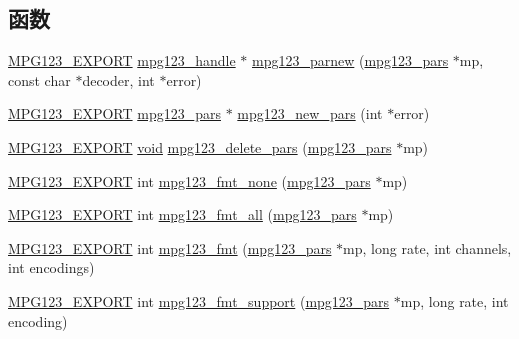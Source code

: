 \subsection*{函数}
\begin{DoxyCompactItemize}
\item 
\hyperlink{mpg123_8h_a2ba98cfba3f760879df70e755b2a61cc}{M\+P\+G123\+\_\+\+E\+X\+P\+O\+RT} \hyperlink{group__mpg123__init_ga6728e2839a395f3a07d4514da659faca}{mpg123\+\_\+handle} $\ast$ \hyperlink{group__mpg123__advpar_gad06a0834157dca25dbcf4775b29a894b}{mpg123\+\_\+parnew} (\hyperlink{group__mpg123__advpar_ga3983578625af3bb6dc7e3b74d0cab4aa}{mpg123\+\_\+pars} $\ast$mp, const char $\ast$decoder, int $\ast$error)
\item 
\hyperlink{mpg123_8h_a2ba98cfba3f760879df70e755b2a61cc}{M\+P\+G123\+\_\+\+E\+X\+P\+O\+RT} \hyperlink{group__mpg123__advpar_ga3983578625af3bb6dc7e3b74d0cab4aa}{mpg123\+\_\+pars} $\ast$ \hyperlink{group__mpg123__advpar_gae40d23747eb55f0ab2612588935d6350}{mpg123\+\_\+new\+\_\+pars} (int $\ast$error)
\item 
\hyperlink{mpg123_8h_a2ba98cfba3f760879df70e755b2a61cc}{M\+P\+G123\+\_\+\+E\+X\+P\+O\+RT} \hyperlink{interfacevoid}{void} \hyperlink{group__mpg123__advpar_gaafc74d249a5a7a545cc6e11576ec5c78}{mpg123\+\_\+delete\+\_\+pars} (\hyperlink{group__mpg123__advpar_ga3983578625af3bb6dc7e3b74d0cab4aa}{mpg123\+\_\+pars} $\ast$mp)
\item 
\hyperlink{mpg123_8h_a2ba98cfba3f760879df70e755b2a61cc}{M\+P\+G123\+\_\+\+E\+X\+P\+O\+RT} int \hyperlink{group__mpg123__advpar_gaf018c28ca2ddcfba5ef7842252ff945a}{mpg123\+\_\+fmt\+\_\+none} (\hyperlink{group__mpg123__advpar_ga3983578625af3bb6dc7e3b74d0cab4aa}{mpg123\+\_\+pars} $\ast$mp)
\item 
\hyperlink{mpg123_8h_a2ba98cfba3f760879df70e755b2a61cc}{M\+P\+G123\+\_\+\+E\+X\+P\+O\+RT} int \hyperlink{group__mpg123__advpar_gae473a32f2aec9d786cd3ae8857d211b1}{mpg123\+\_\+fmt\+\_\+all} (\hyperlink{group__mpg123__advpar_ga3983578625af3bb6dc7e3b74d0cab4aa}{mpg123\+\_\+pars} $\ast$mp)
\item 
\hyperlink{mpg123_8h_a2ba98cfba3f760879df70e755b2a61cc}{M\+P\+G123\+\_\+\+E\+X\+P\+O\+RT} int \hyperlink{group__mpg123__advpar_ga481219fd8962c7b7ab69d4c8daebc094}{mpg123\+\_\+fmt} (\hyperlink{group__mpg123__advpar_ga3983578625af3bb6dc7e3b74d0cab4aa}{mpg123\+\_\+pars} $\ast$mp, long rate, int channels, int encodings)
\item 
\hyperlink{mpg123_8h_a2ba98cfba3f760879df70e755b2a61cc}{M\+P\+G123\+\_\+\+E\+X\+P\+O\+RT} int \hyperlink{group__mpg123__advpar_gaa9a70e142d765916977be699c82bc603}{mpg123\+\_\+fmt\+\_\+support} (\hyperlink{group__mpg123__advpar_ga3983578625af3bb6dc7e3b74d0cab4aa}{mpg123\+\_\+pars} $\ast$mp, long rate, int encoding)

\end{DoxyCompactItemize}
